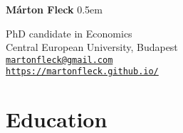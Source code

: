 \documentclass[a4paper,11pt]{article}
\begin{document}
{\huge\bf Márton Fleck}
\parskip 0.5em

PhD candidate in Economics \\
Central European University, Budapest \\
\href{mailto:martonfleck@gmail.com}{\tt martonfleck@gmail.com} \\
\href{http://https://martonfleck.github.io//}{\tt https://martonfleck.github.io/}
\section*{Education}
\end{document}

